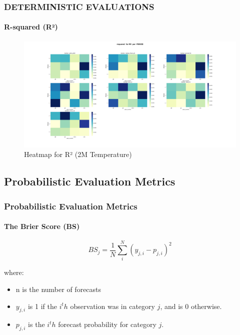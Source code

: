 \begin{frame}
\frametitle{DETERMINISTIC EVALUATIONS}
\framesubtitle{R-squared (R²)}
\begin{figure}[H]
    \centering
    \includegraphics[width=1\linewidth]{rsquared_RR_ PERIOD.png}
    \caption{Heatmap for R² (2M Temperature)}
    \label{fig:rsquared-heatmap}
\end{figure}
\end{frame}


\subsection{Probabilistic Evaluation Metrics}

\begin{frame}
\frametitle{Probabilistic Evaluation Metrics}
\framesubtitle{The Brier Score (BS)}

$$BS_j=\frac{1}{N} \sum\limits_{i}^{N} (y_{j,i} - p_{j,i})^2$$

where:
\begin{itemize}
	\item n is the number of forecasts
	\item $y_{j,i} $ is 1 if the $i^th$ observation was in category $j$, and is 0 otherwise.
	\item $p_{j,i}$  is the $i^th$ forecast probability for category $j$.
\end{itemize}
\end{frame}

